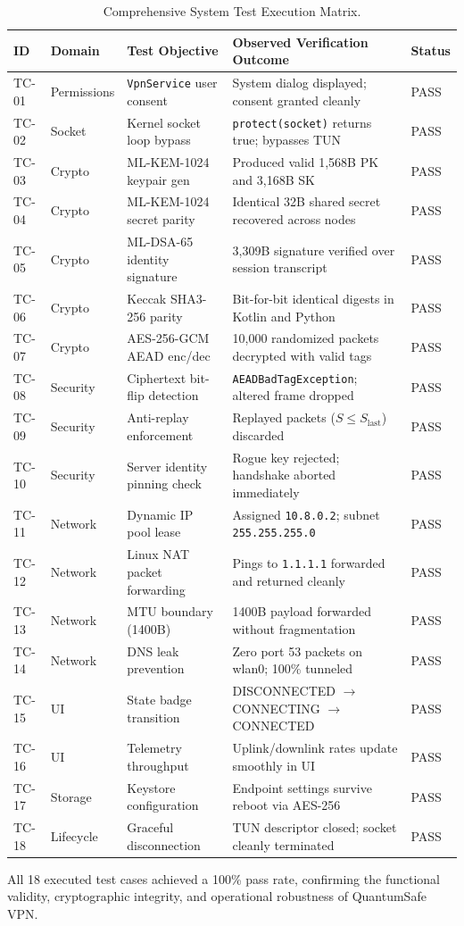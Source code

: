 \begin{table}[htbp]
  \centering
  \scriptsize
  \setlength{\tabcolsep}{2.5pt}
  \caption{Comprehensive System Test Execution Matrix.}
  \label{tab:test_execution_matrix}
  \begin{tabularx}{\linewidth}{@{}p{1.1cm}p{1.6cm}p{3.8cm}Yp{1.1cm}@{}}
    \toprule
    \textbf{ID} & \textbf{Domain} & \textbf{Test Objective} & \textbf{Observed Verification Outcome} & \textbf{Status} \\
    \midrule
    TC-01 & Permissions & \texttt{VpnService} user consent & System dialog displayed; consent granted cleanly & PASS \\
    TC-02 & Socket & Kernel socket loop bypass & \texttt{protect(socket)} returns true; bypasses TUN & PASS \\
    TC-03 & Crypto & ML-KEM-1024 keypair gen & Produced valid 1,568B PK and 3,168B SK & PASS \\
    TC-04 & Crypto & ML-KEM-1024 secret parity & Identical 32B shared secret recovered across nodes & PASS \\
    TC-05 & Crypto & ML-DSA-65 identity signature & 3,309B signature verified over session transcript & PASS \\
    TC-06 & Crypto & Keccak SHA3-256 parity & Bit-for-bit identical digests in Kotlin and Python & PASS \\
    TC-07 & Crypto & AES-256-GCM AEAD enc/dec & 10,000 randomized packets decrypted with valid tags & PASS \\
    TC-08 & Security & Ciphertext bit-flip detection & \texttt{AEADBad}\allowbreak\texttt{TagException}; altered frame dropped & PASS \\
    TC-09 & Security & Anti-replay enforcement & Replayed packets ($S \le S_{\text{last}}$) discarded & PASS \\
    TC-10 & Security & Server identity pinning check & Rogue key rejected; handshake aborted immediately & PASS \\
    TC-11 & Network & Dynamic IP pool lease & Assigned \texttt{10.8.0.2}; subnet \texttt{255.255.255.0} & PASS \\
    TC-12 & Network & Linux NAT packet forwarding & Pings to \texttt{1.1.1.1} forwarded and returned cleanly & PASS \\
    TC-13 & Network & MTU boundary (1400B) & 1400B payload forwarded without fragmentation & PASS \\
    TC-14 & Network & DNS leak prevention & Zero port 53 packets on wlan0; 100\% tunneled & PASS \\
    TC-15 & UI & State badge transition & DISCONNECTED $\to$ CONNECTING $\to$ CONNECTED & PASS \\
    TC-16 & UI & Telemetry throughput & Uplink/downlink rates update smoothly in UI & PASS \\
    TC-17 & Storage & Keystore configuration & Endpoint settings survive reboot via AES-256 & PASS \\
    TC-18 & Lifecycle & Graceful disconnection & TUN descriptor closed; socket cleanly terminated & PASS \\
    \bottomrule
  \end{tabularx}
\end{table}

All 18 executed test cases achieved a 100\% pass rate, confirming the functional validity, cryptographic integrity, and operational robustness of QuantumSafe VPN.
